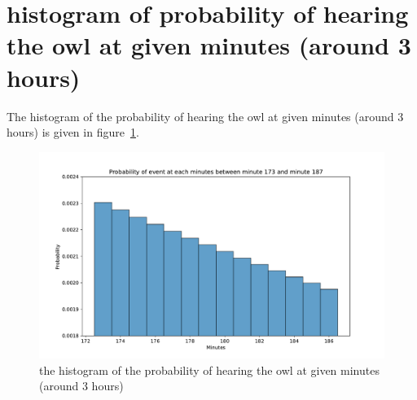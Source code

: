 \section{histogram of probability of hearing the owl at given minutes (around 3 hours)}
The histogram of the probability of hearing the owl at given minutes (around 3 hours) is given in figure~\ref{fig:histogram}.
\begin{figure}[h]
\centering
\includegraphics[width=13cm]{code/figures/event_time_dist_hist.pdf}
\caption{the histogram of the probability of hearing the owl at given minutes (around 3 hours)} \label{fig:histogram}
\end{figure}
\FloatBarrier









